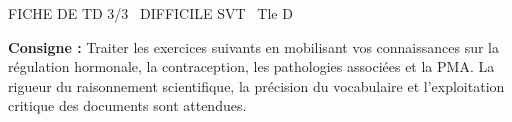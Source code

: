 \documentclass[11pt]{article}
\begin{document}
\begin{tcolorbox}[enhanced,colback=popink,colframe=popink,arc=10pt,boxrule=0pt,left=12pt,right=12pt,top=9pt,bottom=9pt]
{\color{white}\popxbold\small FICHE DE TD 3/3 \textbullet\ DIFFICILE \hfill SVT \textbullet\ Tle D\par}
\end{tcolorbox}
\vspace{4pt}
\noindent \textbf{Consigne :} Traiter les exercices suivants en mobilisant vos connaissances sur la régulation hormonale, la contraception, les pathologies associées et la PMA. La rigueur du raisonnement scientifique, la précision du vocabulaire et l'exploitation critique des documents sont attendues.
\end{document}
